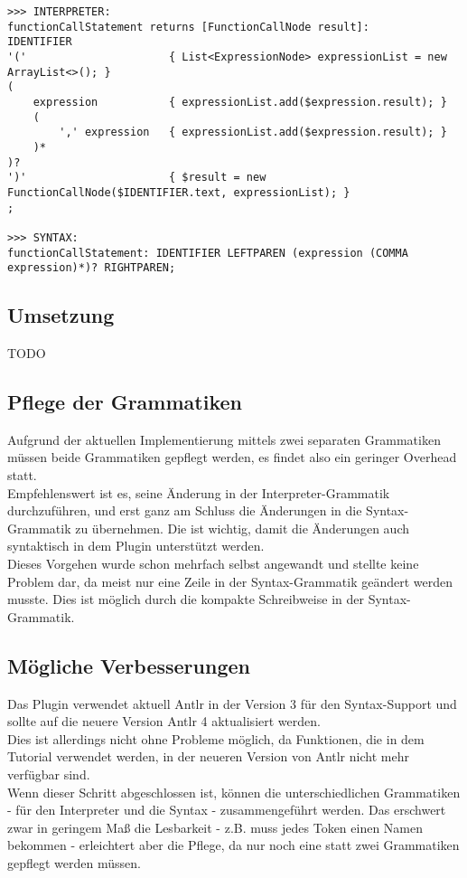 \begin{lstlisting}[label={lst:diffInterpreterSyntax2}, caption={Grammatik-Regel ``functionCallStatement'' Interpreter vs Syntax}, captionpos=b, breaklines=true, postbreak=\mbox{\textcolor{red}{$\hookrightarrow$}\space}]
>>> INTERPRETER:
functionCallStatement returns [FunctionCallNode result]:
IDENTIFIER
'('                      { List<ExpressionNode> expressionList = new ArrayList<>(); }
(
    expression           { expressionList.add($expression.result); }
    (
        ',' expression   { expressionList.add($expression.result); }
    )*
)?
')'                      { $result = new FunctionCallNode($IDENTIFIER.text, expressionList); }
;

>>> SYNTAX:
functionCallStatement: IDENTIFIER LEFTPAREN (expression (COMMA expression)*)? RIGHTPAREN;
\end{lstlisting}

\subsection{Umsetzung}
TODO

\subsection{Pflege der Grammatiken}
Aufgrund der aktuellen Implementierung mittels zwei separaten Grammatiken müssen beide Grammatiken gepflegt werden, es findet also ein geringer Overhead statt.\\
Empfehlenswert ist es, seine Änderung in der Interpreter-Grammatik durchzuführen, und erst ganz am Schluss die Änderungen in die Syntax-Grammatik zu übernehmen. Die ist wichtig, damit die Änderungen auch syntaktisch in dem Plugin unterstützt werden.\\
Dieses Vorgehen wurde schon mehrfach selbst angewandt und stellte keine Problem dar, da meist nur eine Zeile in der Syntax-Grammatik geändert werden musste. Dies ist möglich durch die kompakte Schreibweise in der Syntax-Grammatik.

\subsection{Mögliche Verbesserungen}
Das Plugin verwendet aktuell Antlr in der Version 3 für den Syntax-Support und sollte auf die neuere Version Antlr 4 aktualisiert werden.\\
Dies ist allerdings nicht ohne Probleme möglich, da Funktionen, die in dem Tutorial \cite{netbeansSyntax} verwendet werden, in der neueren Version von Antlr nicht mehr verfügbar sind.\\
Wenn dieser Schritt abgeschlossen ist, können die unterschiedlichen Grammatiken - für den Interpreter und die Syntax - zusammengeführt werden.
Das erschwert zwar in geringem Maß die Lesbarkeit - z.B. muss jedes Token einen Namen bekommen - erleichtert aber die Pflege, da nur noch eine statt zwei Grammatiken gepflegt werden müssen.

